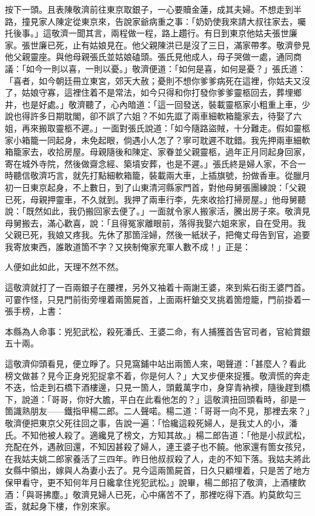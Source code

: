 按下一頭。且表陳敬濟前往東京取銀子，一心要贖金蓮，成其夫婦。不想走到半路，撞見家人陳定從東京來，告說家爺病重之事：「奶奶使我來請大叔往家去，囑托後事。」這敬濟一聞其言，兩程做一程，路上趲行。有日到東京他姑夫張世廉家。張世廉已死，止有姑娘見在。他父親陳洪已是沒了三日，滿家帶孝。敬濟參見他父親靈座。與他母親張氏並姑娘磕頭。張氏見他成人，母子哭做一處，通同商議：「如今一則以喜，一則以憂。」{}敬濟便道：「如何是喜，如何是憂？」張氏道：「喜者，如今朝廷冊立東宮，郊天大赦；憂則不想你爹爹病死在這裡，你姑夫又沒了，姑娘守寡，這裡住着不是常法，如今只得和你打發你爹爹靈柩回去，葬埋鄉井，也是好處。」敬濟聽了，心內暗道：「這一回發送，裝載靈柩家小粗重上車，少說也得許多日期耽閣，卻不誤了六姐？{}不如先誆了兩車細軟箱籠家去，待娶了六姐，再來搬取靈柩不遲。」一面對張氏說道：「如今隨路盜賊，十分難走。假如靈柩家小箱籠一同起身，未免起眼，倘遇小人怎了？寧可耽遲不耽錯。我先押兩車細軟箱籠家去，收拾房屋。母親隨後和陳定、家眷並父親靈柩，過年正月同起身回家，寄在城外寺院，然後做齋念經、築墳安葬，也是不遲。」張氏終是婦人家，不合一時聽信敬濟巧言，就先打點細軟箱籠，裝載兩大車，上插旗號，扮做香車。從臘月初一日東京起身，不上數日，到了山東清河縣家門首，對他母舅張團練說：「父親已死，母親押靈車，不久就到。我押了兩車行李，先來收拾打掃房屋。」他母舅聽說：「既然如此，我仍搬回家去便了。」一面就令家人搬家活，騰出房子來。敬濟見母舅搬去，滿心歡喜，說：「且得冤家離眼前，落得我娶六姐來家，自在受用。我父親已死，我娘又疼我。先休了那箇淫婦，然後一紙狀子，把俺丈母告到官，追要我寄放東西，誰敢道箇不字？{}又挾制俺家充軍人數不成！」正是：

\begin{myquote}
人便如此如此，天理不然不然。
\end{myquote}

這敬濟就打了一百兩銀子在腰裡，另外又袖着十兩謝王婆，來到紫石街王婆門首。可霎作怪，只見門前街旁埋着兩箇屍首，上面兩杆鎗交叉挑着箇燈籠，門前掛着一張手榜，上書：

\begin{myquote}[\markfont]
本縣為人命事：兇犯武松，殺死潘氏、王婆二命，有人捕獲首告官司者，官給賞銀五十兩。
\end{myquote}

這敬濟仰頭看見，便立睜了。只見窩鋪中站出兩箇人來，喝聲道：「甚麼人？看此榜文做甚？見今正身兇犯捉拿不着，你是何人？」大叉步便來捉獲。敬濟慌的奔走不迭，恰走到石橋下酒樓邊，只見一箇人，頭戴萬字巾，身穿青衲襖，隨後趕到橋下，說道：「哥哥，你好大膽，平白在此看他怎的？」這敬濟扭回頭看時，卻是一箇識熟朋友——鐵指甲楊二郎。二人聲喏。楊二道：「哥哥一向不見，那裡去來？」敬濟便把東京父死往回之事，告說一遍：「恰纔這殺死婦人，是我丈人的小，潘氏。不知他被人殺了。適纔見了榜文，方知其故。」楊二郎告道：「他是小叔武松，充配在外，遇赦回還，不知因甚殺了婦人，連王婆子也不饒。他家還有箇女孩兒，在我姑夫姚二郎家養活了三四年。昨日他叔叔殺了人，走的不知下落。我姑夫將此女縣中領出，嫁與人為妻小去了。{}見今這兩箇屍首，日久只顧埋着，只是苦了地方保甲看守，更不知何年月日纔拿住兇犯武松。」說畢，楊二郎招了敬濟，上酒樓飲酒：「與哥拂塵。」敬濟見婦人已死，心中痛苦不了，那裡吃得下酒。約莫飲勾三盃，就起身下樓，作別來家。

